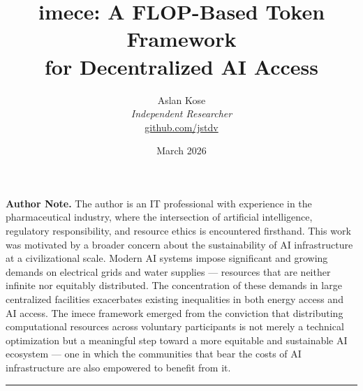 \documentclass[12pt]{article}
\begin{document}
\title{
    \vspace{-1cm}
    \Large\textbf{imece: A FLOP-Based Token Framework\\
    for Decentralized AI Access}\\[0.5em]
    \normalsize
}

\author{
    Aslan Kose\\
    \textit{Independent Researcher}\\
    \href{https://github.com/jstdv}{github.com/jstdv}
}

\date{March 2026}

\maketitle
\thispagestyle{fancy}

\begin{center}
\small
\parbox{0.85\textwidth}{
\textbf{Author Note.}
The author is an IT professional with experience in the pharmaceutical industry, where the intersection of artificial intelligence, regulatory responsibility, and resource ethics is encountered firsthand. This work was motivated by a broader concern about the sustainability of AI infrastructure at a civilizational scale. Modern AI systems impose significant and growing demands on electrical grids and water supplies — resources that are neither infinite nor equitably distributed. The concentration of these demands in large centralized facilities exacerbates existing inequalities in both energy access and AI access. The imece framework emerged from the conviction that distributing computational resources across voluntary participants is not merely a technical optimization but a meaningful step toward a more equitable and sustainable AI ecosystem — one in which the communities that bear the costs of AI infrastructure are also empowered to benefit from it.
}
\end{center}

\vspace{1em}
\hrule
\vspace{1em}
\end{document}
